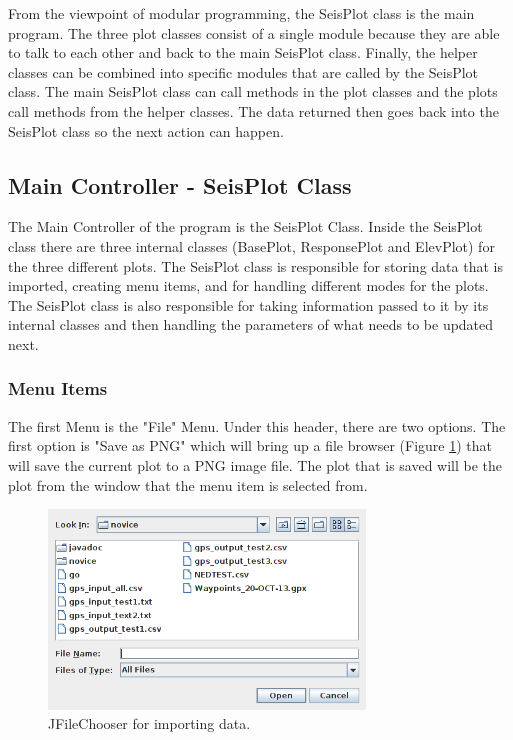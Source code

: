 \documentclass[12pt]{article}
\begin{document}
From the viewpoint of modular programming, the SeisPlot class is the main program. The three plot classes consist of a single module because they are able to talk to each other and back to the main SeisPlot class. Finally, the helper classes can be combined into specific modules that are called by the SeisPlot class. The main SeisPlot class can call methods in the plot classes and the plots call methods from the helper classes. The data returned then goes back into the SeisPlot class so the next action can happen.

\subsection{Main Controller - SeisPlot Class}

The Main Controller of the program is the SeisPlot Class. Inside the SeisPlot class there are three internal classes (BasePlot, ResponsePlot and ElevPlot) for the three different plots. The SeisPlot class is responsible for storing data that is imported, creating menu items, and for handling different modes for the plots. The SeisPlot class is also responsible for taking information passed to it by its internal classes and then handling the parameters of what needs to be updated next. \\

\subsubsection{Menu Items}

The first Menu is the "File" Menu. Under this header, there are two options. The first option is "Save as PNG"  which will bring up a file browser (Figure \ref{FIG:PNG}) that will save the current plot to a PNG image file. The plot that is saved will be the plot from the window that the menu item is selected from.

\begin{figure}[h]
\centering
\includegraphics[width=0.75\textwidth]{./figs/fig0.png}
\caption{JFileChooser for importing data.}
\label{FIG:PNG}
\end{figure}
\end{document}
